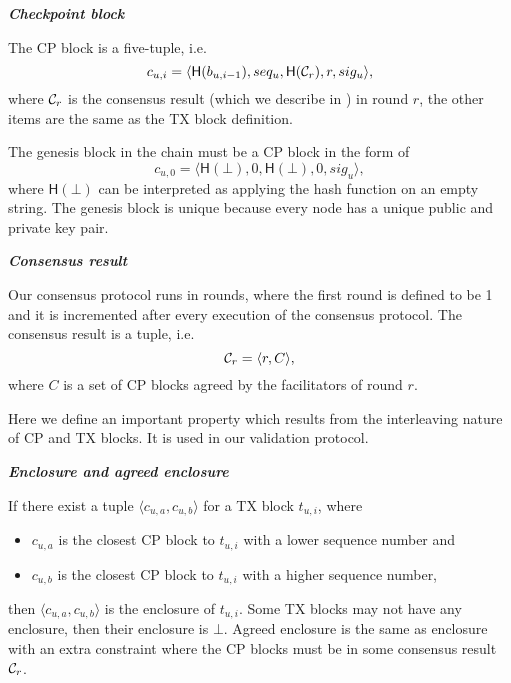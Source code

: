 
\begin{definition}
\textbf{\emph{Checkpoint block}}

The CP block is a five-tuple, i.e. 
$$c_{u, i} = \langle \textsf{H}(b_{u, i-1}), seq_u, \textsf{H}(\mathcal{C}_r), r, sig_u \rangle,$$
where $\mathcal{C}_r$ is the consensus result (which we describe in ) in round $r$,
the other items are the same as the TX block definition.

The genesis block in the chain must be a CP block in the form of
$$c_{u, 0} = \langle \textsf{H}(\bot), 0,  \textsf{H}(\bot), 0, sig_u \rangle,$$
where $\textsf{H}(\bot)$ can be interpreted as applying the hash function on an empty string.
The genesis block is unique because every node has a unique public and private key pair.
\end{definition}


\begin{definition}
\label{sec:consensus-result}
\textbf{\emph{Consensus result}}

Our consensus protocol runs in rounds,
where the first round is defined to be 1 and it is incremented after every execution of the consensus protocol.
The consensus result is a tuple, i.e. 
$$\mathcal{C}_r = \langle r, C \rangle,$$
where $C$ is a set of CP blocks agreed by the facilitators of round $r$.
\end{definition}

Here we define an important property which results from the interleaving nature of CP and TX blocks.
It is used in our validation protocol.
\begin{definition}
\textbf{\emph{Enclosure and agreed enclosure}}

If there exist a tuple $\langle c_{u,a}, c_{u, b} \rangle$ for a TX block $t_{u, i}$, where
\begin{itemize}
\item $c_{u, a}$ is the closest CP block to $t_{u, i}$ with a lower sequence number and
\item $c_{u, b}$ is the closest CP block to $t_{u, i}$ with a higher sequence number,
\end{itemize}
then $\langle c_{u,a}, c_{u, b} \rangle$ is the enclosure of $t_{u, i}$.
Some TX blocks may not have any enclosure, then their enclosure is $\bot$.
Agreed enclosure is the same as enclosure with an extra constraint where the CP blocks must be in some consensus result $\mathcal{C}_r$.

\end{definition}

